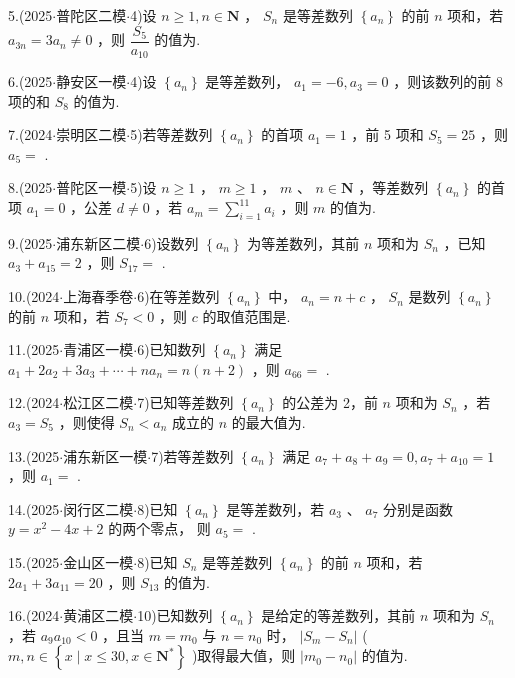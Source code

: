 5.(2025$\cdot$普陀区二模$\cdot$4)设 $n \geq  1,n \in  \mathbf{N}$ ， ${S}_{n}$ 是等差数列 $\left\{  {a}_{n}\right\}$ 的前 $n$ 项和，若 ${a}_{3n} = 3{a}_{n} \neq  0$ ，则 $\dfrac{{S}_{5}}{{a}_{10}}$ 的值为\blkda[2]{}.

6.(2025$\cdot$静安区一模$\cdot$4)设 $\left\{  {a}_{n}\right\}$ 是等差数列， ${a}_{1} =  - 6,{a}_{3} = 0$ ，则该数列的前 8 项的和 ${S}_{8}$ 的值为\blkda[2]{}.

7.(2024$\cdot$崇明区二模$\cdot$5)若等差数列 $\left\{  {a}_{n}\right\}$ 的首项 ${a}_{1} = 1$ ，前 5 项和 ${S}_{5} = {25}$ ，则 ${a}_{5} =$ \blkda[2]{}.

8.(2025$\cdot$普陀区一模$\cdot$5)设 $n \geq  1$ ， $m \geq  1$ ， $m$ 、 $n \in  \mathbf{N}$ ，等差数列 $\left\{  {a}_{n}\right\}$ 的首项 ${a}_{1} = 0$ ，公差 $d \neq  0$ ，若 ${a}_{m} =  \mathop{\sum }\limits_{{i = 1}}^{{11}}{a}_{i}$ ，则 $m$ 的值为\blkda[2]{}.

9.(2025$\cdot$浦东新区二模$\cdot$6)设数列 $\left\{  {a}_{n}\right\}$ 为等差数列，其前 $n$ 项和为 ${S}_{n}$ ，已知 ${a}_{3} + {a}_{15} = 2$ ，则 ${S}_{17} =$ \blkda[2]{}.

10.(2024$\cdot$上海春季卷$\cdot$6)在等差数列 $\left\{  {a}_{n}\right\}$ 中， ${a}_{n} = n + c$ ， ${S}_{n}$ 是数列 $\left\{  {a}_{n}\right\}$ 的前 $n$ 项和，若 ${S}_{7} < 0$ ，则 $c$ 的取值范围是\blkda[2]{}.

11.(2025$\cdot$青浦区一模$\cdot$6)已知数列 $\left\{  {a}_{n}\right\}$ 满足 ${a}_{1} + 2{a}_{2} + 3{a}_{3} + \cdots  + n{a}_{n} = n\left( {n + 2}\right)$ ，则 ${a}_{66} =$ \blkda[2]{}.

12.(2024$\cdot$松江区二模$\cdot$7)已知等差数列 $\left\{  {a}_{n}\right\}$ 的公差为 2，前 $n$ 项和为 ${S}_{n}$ ，若 ${a}_{3} = {S}_{5}$ ，则使得 ${S}_{n} < {a}_{n}$ 成立的 $n$ 的最大值为\blkda[2]{}.

13.(2025$\cdot$浦东新区一模$\cdot$7)若等差数列 $\left\{  {a}_{n}\right\}$ 满足 ${a}_{7} + {a}_{8} + {a}_{9} = 0,{a}_{7} + {a}_{10} = 1$ ，则 ${a}_{1} =$ \blkda[2]{}.

14.(2025$\cdot$闵行区二模$\cdot$8)已知 $\left\{  {a}_{n}\right\}$ 是等差数列，若 ${a}_{3}$ 、 ${a}_{7}$ 分别是函数 $y = {x}^{2} - {4x} + 2$ 的两个零点， 则 ${a}_{5} =$ \blkda[2]{}.

15.(2025$\cdot$金山区一模$\cdot$8)已知 ${S}_{n}$ 是等差数列 $\left\{  {a}_{n}\right\}$ 的前 $n$ 项和，若 $2{a}_{1} + 3{a}_{11} = {20}$ ，则 ${S}_{13}$ 的值为\blkda[2]{}.

16.(2024$\cdot$黄浦区二模$\cdot$10)已知数列 $\left\{  {a}_{n}\right\}$ 是给定的等差数列，其前 $n$ 项和为 ${S}_{n}$ ，若 ${a}_{9}{a}_{10} < 0$ ，且当 $m =  {m}_{0}$ 与 $n = {n}_{0}$ 时， $\left| {{S}_{m} - {S}_{n}}\right|$ ( $m,n \in  \left\{  {x \mid  x \leq  {30},x \in  {\mathbf{N}}^{ * }}\right\}$ )取得最大值，则 $\left| {{m}_{0} - {n}_{0}}\right|$ 的值为\blkda[2]{}.


